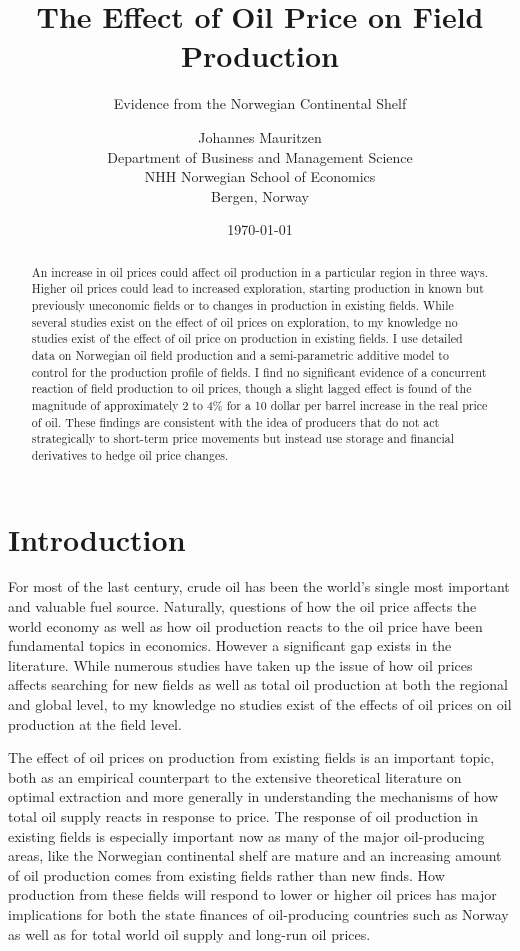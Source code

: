\documentclass[12pt]{scrartcl} %
\title{The Effect of Oil Price on Field Production}
\subtitle{Evidence from the Norwegian Continental Shelf}
\author{
  		Johannes Mauritzen \\
        Department of Business and Management Science\\
        NHH Norwegian School of Economics\\
        Bergen, Norway \\	           
		}
\date{\today}
\begin{document}
\begin{spacing}{1} %
	\maketitle
\end{spacing}

\begin{abstract}
An increase in oil prices could affect oil production in a particular region in three ways.  Higher oil prices could lead to increased exploration, starting production in known but previously uneconomic fields or to changes in production in existing fields.  While several studies exist on the effect of oil prices on exploration, to my knowledge no studies exist of the effect of oil price on production in existing fields.  I use detailed data on Norwegian oil field production and a semi-parametric additive model to control for the production profile of fields.  I find no significant evidence of a concurrent reaction of field production to oil prices, though a slight lagged effect is found of the magnitude of approximately 2 to 4\% for a 10 dollar per barrel increase in the real price of oil.  These findings are consistent with the idea of producers that do not act strategically to short-term price movements but instead use storage and financial derivatives to hedge oil price changes.  
\end{abstract}


\section{Introduction}

For most of the last century, crude oil has been the world’s single most important and valuable fuel source.  Naturally, questions of how the oil price affects the world economy as well as how oil production reacts to the oil price have been fundamental topics in economics. However a significant gap exists in the literature.  While numerous studies have taken up the issue of how oil prices affects searching for new fields as well as total oil production at both the regional and global level, to my knowledge no studies exist of the effects of oil prices on oil production at the field level.  

The effect of oil prices on production from existing fields is an important topic, both as an empirical counterpart to the extensive theoretical literature on optimal extraction and more generally in understanding the mechanisms of how total oil supply reacts in response to price.  The response of oil production in existing fields is especially important now as many of the major oil-producing areas, like the Norwegian continental shelf are mature and an increasing amount of oil production comes from existing fields rather than new finds.  How production from these fields will respond to lower or higher oil prices has major implications for both the state finances of oil-producing countries such as Norway as well as for total world oil supply and long-run oil prices.  
\end{document}
